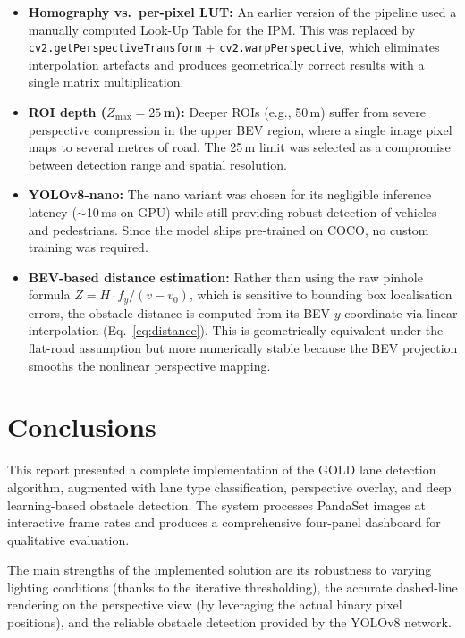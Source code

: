 \documentclass[11pt,a4paper]{article}
\begin{document}
\begin{itemize}
    \item \textbf{Homography vs.\ per-pixel LUT:} An earlier version of the pipeline used a manually computed Look-Up Table for the IPM. This was replaced by \texttt{cv2.getPerspectiveTransform} + \texttt{cv2.warpPerspective}, which eliminates interpolation artefacts and produces geometrically correct results with a single matrix multiplication.

    \item \textbf{ROI depth ($Z_{\max} = 25$\,m):} Deeper ROIs (e.g., 50\,m) suffer from severe perspective compression in the upper BEV region, where a single image pixel maps to several metres of road. The 25\,m limit was selected as a compromise between detection range and spatial resolution.

    \item \textbf{YOLOv8-nano:} The nano variant was chosen for its negligible inference latency ($\sim$10\,ms on GPU) while still providing robust detection of vehicles and pedestrians. Since the model ships pre-trained on COCO, no custom training was required.

    \item \textbf{BEV-based distance estimation:} Rather than using the raw pinhole formula $Z = H \cdot f_y / (v - v_0)$, which is sensitive to bounding box localisation errors, the obstacle distance is computed from its BEV $y$-coordinate via linear interpolation (Eq.~\eqref{eq:distance}). This is geometrically equivalent under the flat-road assumption but more numerically stable because the BEV projection smooths the nonlinear perspective mapping.
\end{itemize}


\section{Conclusions}

This report presented a complete implementation of the GOLD lane detection algorithm, augmented with lane type classification, perspective overlay, and deep learning-based obstacle detection. The system processes PandaSet images at interactive frame rates and produces a comprehensive four-panel dashboard for qualitative evaluation.

The main strengths of the implemented solution are its robustness to varying lighting conditions (thanks to the iterative thresholding), the accurate dashed-line rendering on the perspective view (by leveraging the actual binary pixel positions), and the reliable obstacle detection provided by the YOLOv8 network.
\end{document}
